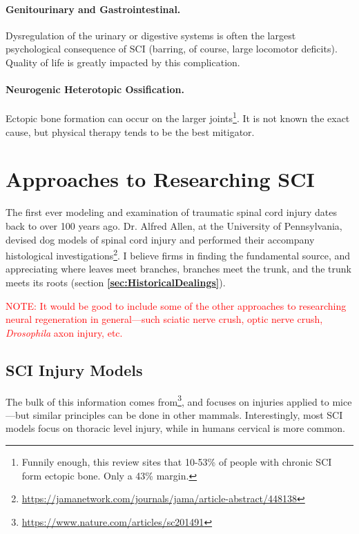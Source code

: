 \documentclass[12pt]{report}
\begin{document}
\subsubsection{Genitourinary and Gastrointestinal.}
Dysregulation of the urinary or digestive systems is often the largest psychological consequence of SCI (barring, of course, large locomotor deficits). Quality of life is greatly impacted by this complication. 

\subsubsection{Neurogenic Heterotopic Ossification.}
Ectopic bone formation can occur on the larger joints\footnote{Funnily enough, this review sites that 10-53\% of people with chronic SCI form ectopic bone. Only a 43\% margin.}. It is not known the exact cause, but physical therapy tends to be the best mitigator. 




\chapter{Approaches to Researching SCI}

The first ever modeling and examination of traumatic spinal cord injury dates back to over 100 years ago. Dr. Alfred Allen, at the University of Pennsylvania, devised dog models of spinal cord injury and performed their accompany histological investigations\footnote{\url{https://jamanetwork.com/journals/jama/article-abstract/448138}}. I believe firms in finding the fundamental source, and appreciating where leaves meet branches, branches meet the trunk, and the trunk meets its roots (section \textbf{\ref{sec:HistoricalDealings}}).\newline

\textcolor{red}{NOTE: It would be good to include some of the other approaches to researching neural regeneration in general---such sciatic nerve crush, optic nerve crush, \textit{Drosophila} axon injury, etc.}

\section{SCI Injury Models}
The bulk of this information comes from\footnote{\url{https://www.nature.com/articles/sc201491}}, and focuses on injuries applied to mice---but similar principles can be done in other mammals. Interestingly, most SCI models focus on thoracic level injury, while in humans cervical is more common. 
\end{document}
